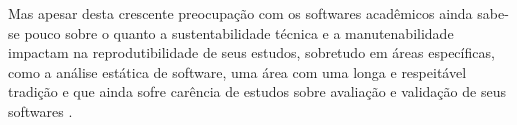 Mas apesar desta crescente preocupação com os softwares acadêmicos ainda
sabe-se pouco sobre o quanto a sustentabilidade técnica e a manutenabilidade
impactam na reprodutibilidade de seus estudos, sobretudo em áreas específicas,
como a análise estática de software, uma área com uma longa e respeitável
tradição e que ainda sofre carência de estudos sobre avaliação e validação de
seus softwares \cite{Li2010, ilyas2016static}.

%
%
%
%
%
%
%
%
%
%
%
%
%
%
%
%

